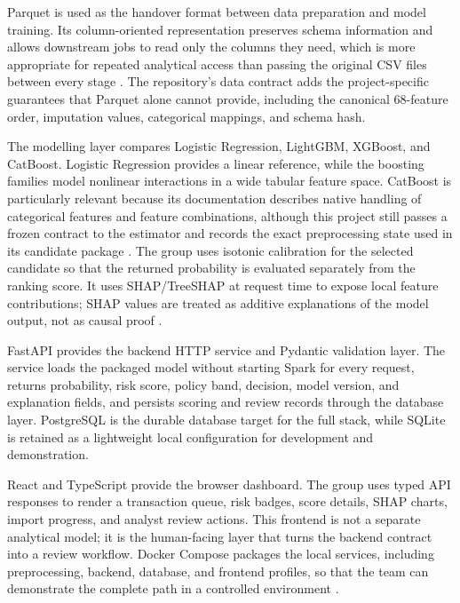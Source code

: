 Parquet is used as the handover format between data preparation and model
training. Its column-oriented representation preserves schema information and
allows downstream jobs to read only the columns they need, which is more
appropriate for repeated analytical access than passing the original CSV files
between every stage \parencite{sparkparquet}. The repository's data contract
adds the project-specific guarantees that Parquet alone cannot provide,
including the canonical 68-feature order, imputation values, categorical
mappings, and schema hash.

The modelling layer compares Logistic Regression, LightGBM, XGBoost, and
CatBoost. Logistic Regression provides a linear reference, while the boosting
families model nonlinear interactions in a wide tabular feature space. CatBoost
is particularly relevant because its documentation describes native handling
of categorical features and feature combinations, although this project still
passes a frozen contract to the estimator and records the exact preprocessing
state used in its candidate package \parencite{prokhorenkova2018catboost,catboostdocs}.
The group uses isotonic calibration for the selected candidate so that the
returned probability is evaluated separately from the ranking score. It uses
SHAP/TreeSHAP at request time to expose local feature contributions; SHAP values
are treated as additive explanations of the model output, not as causal proof
\parencite{lundberg2017shap}.

FastAPI provides the backend HTTP service and Pydantic validation layer. The
service loads the packaged model without starting Spark for every request,
returns probability, risk score, policy band, decision, model version, and
explanation fields, and persists scoring and review records through the
database layer. PostgreSQL is the durable database target for the full stack,
while SQLite is retained as a lightweight local configuration for development
and demonstration.

React and TypeScript provide the browser dashboard. The group uses typed API
responses to render a transaction queue, risk badges, score details, SHAP
charts, import progress, and analyst review actions. This frontend is not a
separate analytical model; it is the human-facing layer that turns the backend
contract into a review workflow. Docker Compose packages the local services,
including preprocessing, backend, database, and frontend profiles, so that the
team can demonstrate the complete path in a controlled environment
\parencite{fastapi,postgresql,react,dockerdocs}.

